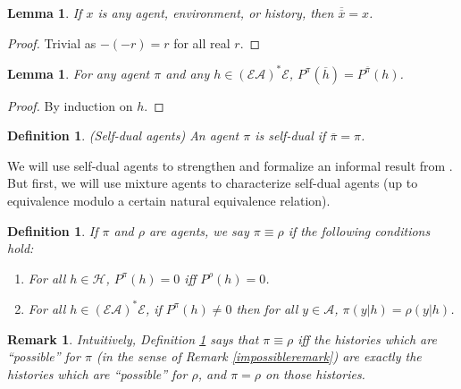 \documentclass[twoside]{article}
\newtheorem{definition}[theorem]{Definition}
\newtheorem{remark}[theorem]{Remark}
\newtheorem{lemma}[theorem]{Lemma}
\begin{document}
\begin{lemma}
\label{doublenegationlemma}
    If $x$ is any agent, environment, or history,
    then $\overline{\overline x}=x$.
\end{lemma}

\begin{proof}
    Trivial as $-(-r)=r$ for all real $r$.
\end{proof}

\begin{lemma}
\label{asteriskcommuteswithoverlinelemma}
    For any agent $\pi$ and any $h\in(\mathcal E\mathcal A)^*\mathcal E$,
    $P^\pi(\overline h)=P^{\overline{\pi}}(h)$.
\end{lemma}

\begin{proof}
    By induction on $h$.
\end{proof}

\begin{definition}
    (Self-dual agents)
    An agent $\pi$ is \emph{self-dual} if $\overline{\pi}=\pi$.
\end{definition}

We will use self-dual agents to strengthen and formalize an informal result
from \cite{alexander2021reward}.
But first, we will use mixture agents to characterize
self-dual agents (up to equivalence modulo a certain natural equivalence relation).

\begin{definition}
\label{equivdefn}
    If $\pi$ and $\rho$ are agents, we say $\pi\equiv\rho$ if the
    following conditions hold:
    \begin{enumerate}
        \item For all $h\in\mathcal H$, $P^\pi(h)=0$ iff $P^\rho(h)=0$.
        \item For all $h\in(\mathcal E\mathcal A)^*\mathcal E$,
            if $P^\pi(h)\not=0$ then for all $y\in\mathcal A$,
            $\pi(y|h)=\rho(y|h)$.
    \end{enumerate}
\end{definition}

\begin{remark}
    Intuitively, Definition \ref{equivdefn} says that $\pi\equiv\rho$
    iff the histories which are ``possible'' for $\pi$ (in the sense of
    Remark \ref{impossibleremark}) are exactly the histories which are
    ``possible'' for $\rho$, and $\pi=\rho$ on those histories.
\end{remark}
\end{document}
